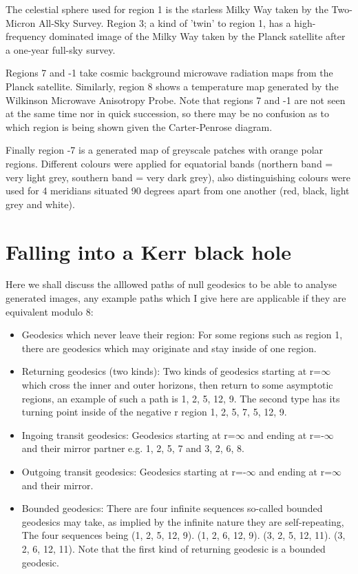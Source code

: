 \documentclass[oneside,openright,frontopenright, singlespacing]{dmathesis}
\begin{document}
\vspace{1em}
	The celestial sphere used for region 1 is the starless Milky Way taken by the Two-Micron All-Sky Survey\cite{skrutskie2006two}. Region 3; a kind of 'twin' to region 1, has a high-frequency dominated image of the Milky Way taken by the Planck satellite after a one-year full-sky survey\cite{planck2011astronomy}.

\vspace{1em}
	Regions 7 and -1 take cosmic background microwave radiation maps from the Planck satellite\cite{adam2016planck}. Similarly, region 8 shows a temperature map generated by the Wilkinson Microwave Anisotropy Probe\cite{bennet2013wmap}. Note that regions 7 and -1 are not seen at the same time nor in quick succession, so there may be no confusion as to which region is being shown given the Carter-Penrose diagram.

\vspace{1em}
	Finally region -7 is a generated map of greyscale patches with orange polar regions. Different colours were applied for equatorial bands (northern band = very light grey, southern band = very dark grey), also distinguishing colours were used for 4 meridians situated 90 degrees apart from one another (red, black, light grey and white).

\section{Falling into a Kerr black hole}\label{sec:Section6.2}

\vspace{1em}
	Here we shall discuss the alllowed paths of null geodesics to be able to analyse generated images, any example paths which I give here are applicable if they are equivalent modulo 8:

\vspace{1em}
\begin{itemize}
  \item Geodesics which never leave their region: For some regions such as region 1, there are geodesics which may originate and stay inside of one region.
  \item Returning geodesics (two kinds): Two kinds of geodesics starting at r=$\infty$ which cross the inner and outer horizons, then return to some asymptotic regions, an example of such a path is 1, 2, 5, 12, 9. The second type has its turning point inside of the negative r region 1, 2, 5, 7, 5, 12, 9.
  \item Ingoing transit geodesics: Geodesics starting at r=$\infty$ and ending at r=-$\infty$ and their mirror partner e.g. 1, 2, 5, 7 and 3, 2, 6, 8.
  \item Outgoing transit geodesics: Geodesics starting at r=-$\infty$ and ending at r=$\infty$ and their mirror.
  \item Bounded geodesics: There are four infinite sequences so-called bounded geodesics may take, as implied by the infinite nature they are self-repeating, The four sequences being (1, 2, 5, 12, 9). (1, 2, 6, 12, 9). (3, 2, 5, 12, 11). (3, 2, 6, 12, 11). Note that the first kind of returning geodesic is a bounded geodesic.
\end{itemize}
\end{document}
